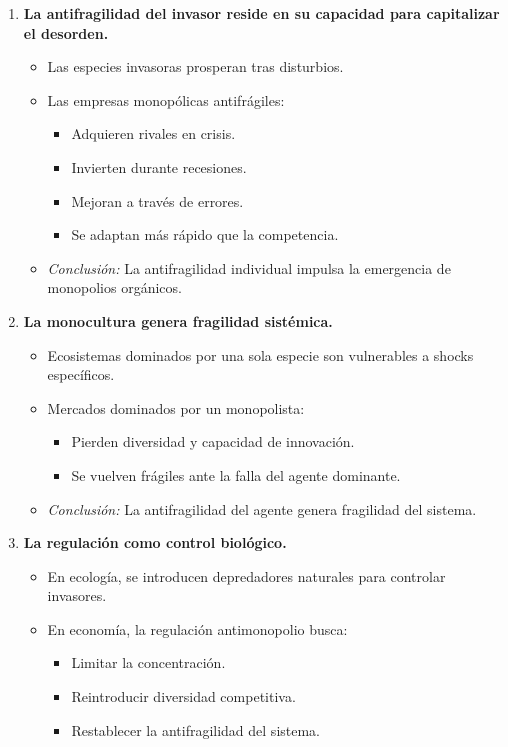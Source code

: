 \documentclass[a4paper,12pt]{article}
\begin{document}
\begin{enumerate}
    \item \textbf{La antifragilidad del invasor reside en su capacidad para capitalizar el desorden.}
    \begin{itemize}
        \item Las especies invasoras prosperan tras disturbios.
        \item Las empresas monopólicas antifrágiles:
        \begin{itemize}
            \item Adquieren rivales en crisis.
            \item Invierten durante recesiones.
            \item Mejoran a través de errores.
            \item Se adaptan más rápido que la competencia.
        \end{itemize}
        \item \textit{Conclusión:} La antifragilidad individual impulsa la emergencia de monopolios orgánicos.
    \end{itemize}

    \item \textbf{La monocultura genera fragilidad sistémica.}
    \begin{itemize}
        \item Ecosistemas dominados por una sola especie son vulnerables a shocks específicos.
        \item Mercados dominados por un monopolista:
        \begin{itemize}
            \item Pierden diversidad y capacidad de innovación.
            \item Se vuelven frágiles ante la falla del agente dominante.
        \end{itemize}
        \item \textit{Conclusión:} La antifragilidad del agente genera fragilidad del sistema.
    \end{itemize}

    \item \textbf{La regulación como control biológico.}
    \begin{itemize}
        \item En ecología, se introducen depredadores naturales para controlar invasores.
        \item En economía, la regulación antimonopolio busca:
        \begin{itemize}
            \item Limitar la concentración.
            \item Reintroducir diversidad competitiva.
            \item Restablecer la antifragilidad del sistema.
        \end{itemize}
    \end{itemize}
\end{enumerate}
\end{document}
